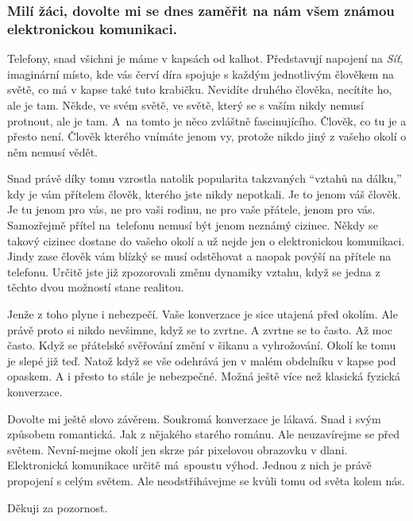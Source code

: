 \documentclass[11pt]{article}
\begin{document}
\setlength{\parindent}{1em}


\subsubsection*{Milí žáci, dovolte mi se dnes zaměřit na nám všem známou elektronickou komunikaci.}

\hspace{1em}Telefony, snad všichni je máme v kapsách od kalhot.
Představují napojení na \textit{Síť}, imaginární místo, kde vás červí díra spojuje s každým jednotlivým člověkem na světě, co má v kapse také tuto krabičku.
Nevidíte druhého člověka, necítíte ho, ale je tam.
Někde, ve svém světě, ve světě, který se s vaším nikdy nemusí protnout, ale je tam.
A~na tomto je něco zvláštně fascinujícího.
Člověk, co tu je a přesto není.
Člověk kterého vnímáte jenom vy, protože nikdo jiný z vašeho okolí o něm nemusí vědět.
\par Snad právě díky tomu vzrostla natolik popularita takzvaných \enquote{vztahů na dálku,} kdy je vám přítelem člověk, kterého jste nikdy nepotkali.
Je to jenom váš člověk.
Je tu jenom pro vás, ne pro vaši rodinu, ne pro vaše přátele, jenom pro vás.
Samozřejmě přítel na~telefonu nemusí být jenom neznámý cizinec.
Někdy se takový cizinec dostane do vašeho okolí a už nejde jen o elektronickou komunikaci.
Jindy zase člověk vám blízký se musí odstěhovat a naopak povýší na přítele na telefonu.
Určitě jste již zpozorovali změnu dynamiky vztahu, když se jedna z těchto dvou možností stane realitou.
\par Jenže z toho plyne i nebezpečí.
Vaše konverzace je sice utajená před okolím.
Ale právě proto si nikdo nevšimne, když se to zvrtne.
A zvrtne se to často.
Až moc často.
Když se přátelské svěřování změní v šikanu a vyhrožování.
Okolí ke tomu je slepé již teď.
Natož když se vše odehrává jen v malém obdelníku v kapse pod opaskem.
A i přesto to stále je nebezpečné.
Možná ještě více než klasická fyzická konverzace.
\par Dovolte mi ještě slovo závěrem.
Soukromá konverzace je lákavá.
Snad i svým způsobem romantická.
Jak z nějakého starého románu.
Ale neuzavírejme se před světem.
Nevní-mejme okolí jen skrze pár pixelovou obrazovku v dlani.
Elektronická komunikace určitě má~spoustu výhod.
Jednou z nich je právě propojení s celým světem.
Ale neodstřihávejme se kvůli tomu od světa kolem nás.
\vspace{1em}
\par\noindent Děkuji za pozornost.
\end{document}
